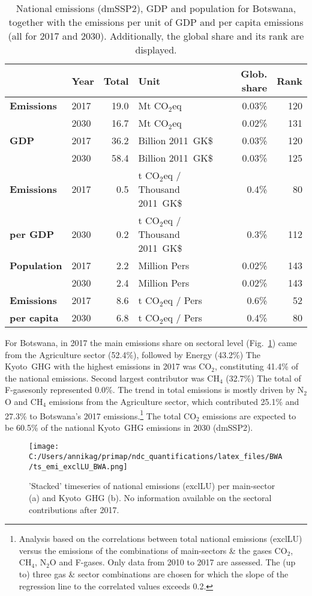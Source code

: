 \documentclass[12pt]{article}
\begin{document}
 \begin{table}[H]
 \centering
 \caption{National emissions (dmSSP2), GDP and population for Botswana, together with the emissions per unit of GDP and per capita emissions (all for 2017 and 2030). 
 Additionally, the global share and its rank are displayed.}
 \label{tab:overview}
 \begin{tabular}{l || l r l r r}
 \bfseries  & \bfseries Year & \bfseries Total & \bfseries Unit & \bfseries Glob. share & \bfseries Rank \tabularnewline \hline \hline
 \bfseries Emissions & 2017 & 19.0 & Mt CO$_2$eq & 0.03\% & 120 \tabularnewline 
 \bfseries  & 2030 & 16.7 & Mt CO$_2$eq & 0.02\% & 131 \tabularnewline \hline
 \bfseries GDP & 2017 & 36.2 & Billion 2011~GK\$ & 0.03\% & 120 \tabularnewline 
 \bfseries  & 2030 & 58.4 & Billion 2011~GK\$ & 0.03\% & 125 \tabularnewline \hline
 \bfseries Emissions & 2017 & 0.5 & t CO$_2$eq / Thousand 2011~GK\$ & 0.4\% & 80 \tabularnewline 
 \bfseries per GDP & 2030 & 0.2 & t CO$_2$eq / Thousand 2011~GK\$ & 0.3\% & 112 \tabularnewline \hline
 \bfseries Population & 2017 & 2.2 & Million Pers & 0.02\% & 143 \tabularnewline 
 \bfseries  & 2030 & 2.4 & Million Pers & 0.02\% & 143 \tabularnewline \hline
 \bfseries Emissions & 2017 & 8.6 & t CO$_2$eq /  Pers & 0.6\% & 52 \tabularnewline 
 \bfseries per capita & 2030 & 6.8 & t CO$_2$eq /  Pers & 0.4\% & 80 \tabularnewline 
 \end{tabular}
 \end{table}

 For Botswana, in 2017 the main emissions share on sectoral level (Fig.~\ref{fig:tsEmi}) came from the Agriculture sector (52.4\%), followed by Energy (43.2\%)
 The Kyoto~GHG with the highest emissions in 2017 was CO$_2$, constituting  41.4\% of the national emissions. 
 Second largest contributor was CH$_4$ (32.7\%)
 The total of F-gasesonly represented 0.0\%.
 The trend in total emissions is mostly driven by N$_2$O and CH$_4$ emissions from the Agriculture sector, which contributed 25.1\% and 27.3\% to Botswana's 2017 emissions.\footnote{Analysis based on the correlations between total national emissions (exclLU) versus the emissions of the combinations of main-sectors \& the gases CO$_2$, CH$_4$, N$_2$O and F-gases. 
 Only data from 2010 to 2017 are assessed. 
 The (up to) three gas \& sector combinations are chosen for which the slope of the regression line to the correlated values exceeds 0.2.}
 The total CO$_2$ emissions are expected to be 60.5\% of the national Kyoto~GHG emissions in 2030 (dmSSP2).

 \begin{figure}[H]
 \centering
 \texttt{[image: C:/Users/annikag/primap/ndc\_quantifications/latex\_files/BWA/ts\_emi\_exclLU\_BWA.png]}
 \caption{'Stacked' timeseries of national emissions (exclLU) per main-sector (a) and Kyoto~GHG (b). 
 No information available on the sectoral contributions after 2017.}
 \label{fig:tsEmi}
 \end{figure}
\end{document}
